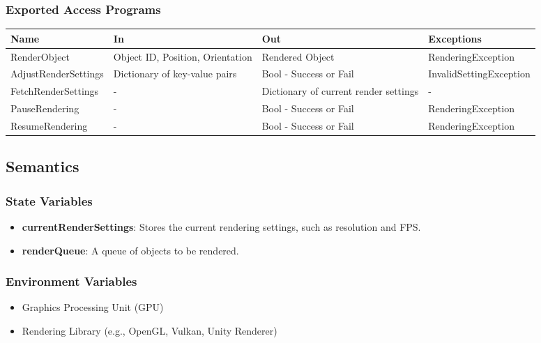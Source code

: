 \documentclass[12pt, titlepage]{article}
\begin{document}
\subsubsection{Exported Access Programs}

\begin{center}
\begin{tabular}{p{4cm} p{4cm} p{4cm} p{4cm}}
\hline
\textbf{Name} & \textbf{In} & \textbf{Out} & \textbf{Exceptions} \\
\hline
RenderObject & Object ID, Position, Orientation & Rendered Object & RenderingException \\
\hline
AdjustRenderSettings & Dictionary of key-value pairs & Bool - Success or Fail & InvalidSettingException \\
\hline
FetchRenderSettings & - & Dictionary of current render settings & - \\
\hline
PauseRendering & - & Bool - Success or Fail & RenderingException \\
\hline
ResumeRendering & - & Bool - Success or Fail & RenderingException \\
\hline
\end{tabular}
\end{center}

\subsection{Semantics}

\subsubsection{State Variables}

\begin{itemize}
    \item \textbf{currentRenderSettings}: Stores the current rendering settings, such as resolution and FPS.
    \item \textbf{renderQueue}: A queue of objects to be rendered.
\end{itemize}

\subsubsection{Environment Variables}

\begin{itemize}
    \item Graphics Processing Unit (GPU)
    \item Rendering Library (e.g., OpenGL, Vulkan, Unity Renderer)
\end{itemize}
\end{document}
